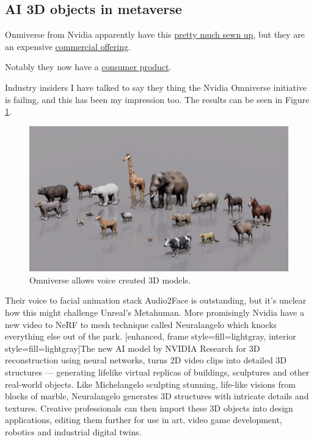 \subsection{AI 3D objects in metaverse}
Onmiverse from Nvidia apparently have this \href{https://www.nvidia.com/en-us/gpu-cloud/picasso/}{pretty much sewn up}, but they are an expensive \href{https://developer.nvidia.com/blog/rapidly-generate-3d-assets-for-virtual-worlds-with-generative-ai/}{commercial offering}. \par
Notably they now have a \href{https://blogs.nvidia.com/blog/2023/06/27/magiscan-app-augmented-reality-openusd/?}{consumer product}. \par
Industry insiders I have talked to say they thing the Nvidia Omniverse initiative is failing, and this has been my impression too. The results can be seen in Figure \ref{fig:nvidiavoice}.
\begin{figure}[htbp]
    \centering
    \includegraphics{nvidiavoice}
    \caption{Omniverse allows voice created 3D models.}
    \label{fig:nvidiavoice}
\end{figure}
Their voice to facial animation stack Audio2Face is outstanding, but it's unclear how this might challenge Unreal's Metahuman. More promisingly Nvidia have a new video to NeRF to mesh technique called Neuralangelo \cite{li2023neuralangelo} which knocks everything else out of the park. 
[enhanced, frame style={fill=lightgray}, interior style={fill=lightgray}]The new AI model by NVIDIA Research for 3D reconstruction using neural networks, turns 2D video clips into detailed 3D structures — generating lifelike virtual replicas of buildings, sculptures and other real-world objects. Like Michelangelo sculpting stunning, life-like visions from blocks of marble, Neuralangelo generates 3D structures with intricate details and textures. Creative professionals can then import these 3D objects into design applications, editing them further for use in art, video game development, robotics and industrial digital twins.
